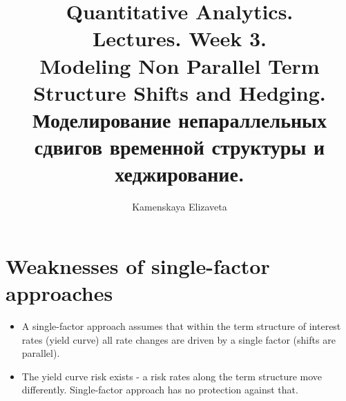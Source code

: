 \documentclass{article}
\title{Quantitative Analytics.\\
Lectures. Week 3. \\
Modeling Non Parallel Term Structure Shifts and Hedging. Моделирование непараллельных сдвигов временной структуры и хеджирование.}
\author{Kamenskaya Elizaveta}
\begin{document}
\maketitle

\setcounter{tocdepth}{1} %
\renewcommand\contentsname{Contents}
\tableofcontents
\newpage




\renewcommand{\labelitemi}{\tiny$\bullet$}
\renewcommand{\figurename}{Fig.}

 \section{Weaknesses of single-factor approaches}
 \begin{itemize}
     \item A single-factor approach assumes that within the term structure of interest rates (yield curve) all rate changes are driven by a single factor (shifts are parallel).

     \item The yield curve risk exists - a risk rates along the term structure move differently. Single-factor approach has no protection against that.
 \end{itemize}
\end{document}
